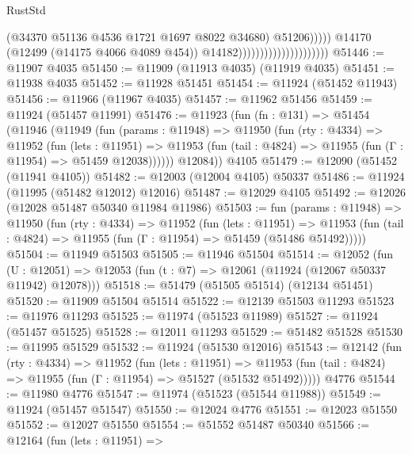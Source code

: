 \begin{lexlean}{RustStd}
\begin{coremodule}
{\begin{coremodule}
{{{{{{{{{{{{{{{{{{{{{{{{{{{{{{{{{{{{{{{{{{{{{{{{{{{{{{{{{{{{{{{{{{{{{{{{{{{{{{{{                                                        (@34370
                                                          @51136
                                                          @4536
                                                          @1721
                                                          @1697
                                                          @8022
                                                          @34680)
                                                        @51206)))))
                                              @14170
                                              (@12499 (@14175 @4066 @4089 @454))
                                              @14182)))))))))))))))))))))
@51446 := @11907 @4035
@51450 := @11909 (@11913 @4035) (@11919 @4035)
@51451 := @11938 @4035
@51452 := @11928 @51451
@51454 := @11924 (@51452 @11943)
@51456 := @11966 (@11967 @4035)
@51457 := @11962 @51456
@51459 := @11924 (@51457 @11991)
@51476 := @11923
    (fun (fn : @131) =>
    @51454
      (@11946
        (@11949
          (fun (params : @11948) =>
          @11950
            (fun (rty : @4334) =>
            @11952
              (fun (lets : @11951) =>
              @11953 (fun (tail : @4824) => @11955 (fun (Γ : @11954) => @51459 @12038))))))
        @12084))
    @4105
@51479 := @12090 (@51452 (@11941 @4105))
@51482 := @12003 (@12004 @4105) @50337
@51486 := @11924 (@11995 (@51482 @12012) @12016)
@51487 := @12029 @4105
@51492 := @12026 (@12028 @51487 @50340 @11984 @11986)
@51503 := fun (params : @11948) =>
  @11950
    (fun (rty : @4334) =>
    @11952
      (fun (lets : @11951) =>
      @11953 (fun (tail : @4824) => @11955 (fun (Γ : @11954) => @51459 (@51486 @51492)))))
@51504 := @11949 @51503
@51505 := @11946 @51504
@51514 := @12052
    (fun (U : @12051) => @12053 (fun (t : @7) => @12061 (@11924 (@12067 @50337 @11942) @12078)))
@51518 := @51479 (@51505 @51514) (@12134 @51451)
@51520 := @11909 @51504 @51514
@51522 := @12139 @51503 @11293
@51523 := @11976 @11293
@51525 := @11974 (@51523 @11989)
@51527 := @11924 (@51457 @51525)
@51528 := @12011 @11293
@51529 := @51482 @51528
@51530 := @11995 @51529
@51532 := @11924 (@51530 @12016)
@51543 := @12142
    (fun (rty : @4334) =>
    @11952
      (fun (lets : @11951) =>
      @11953 (fun (tail : @4824) => @11955 (fun (Γ : @11954) => @51527 (@51532 @51492)))))
    @4776
@51544 := @11980 @4776
@51547 := @11974 (@51523 (@51544 @11988))
@51549 := @11924 (@51457 @51547)
@51550 := @12024 @4776
@51551 := @12023 @51550
@51552 := @12027 @51550
@51554 := @51552 @51487 @50340
@51566 := @12164
    (fun (lets : @11951) =>
}}}}}}}}}}}}}}}}}}}}}}}}}}}}}}}}}}}}}}}}}}}}}}}}}}}}}}}}}}}}}}}}}}}}}}}}}}}}}}}}
\end{coremodule}}
\end{coremodule}
\end{lexlean}
